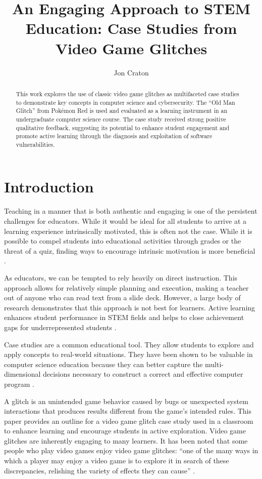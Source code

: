 \documentclass[letterpaper]{article}
\title{An Engaging Approach to STEM Education: Case Studies from Video Game Glitches}
\author[1]{Jon Craton}
\affil[1]{Anderson University, Anderson, IN}
\date{} %
\begin{document}
\maketitle

\begin{abstract}
This work explores the use of classic video game glitches as multifaceted case studies to demonstrate key concepts in computer science and cybersecurity. The ``Old Man Glitch'' from Pokémon Red is used and evaluated as a learning instrument in an undergraduate computer science course. The case study received strong positive qualitative feedback, suggesting its potential to enhance student engagement and promote active learning through the diagnosis and exploitation of software vulnerabilities.
\end{abstract}

\section{Introduction}
Teaching in a manner that is both authentic and engaging is one of the persistent challenges for educators. While it would be ideal for all students to arrive at a learning experience intrinsically motivated, this is often not the case. While it is possible to compel students into educational activities through grades or the threat of a quiz, finding ways to encourage intrinsic motivation is more beneficial \cite{deci2013intrinsic}.

As educators, we can be tempted to rely heavily on direct instruction. This approach allows for relatively simple planning and execution, making a teacher out of anyone who can read text from a slide deck. However, a large body of research demonstrates that this approach is not best for learners. Active learning enhances student performance in STEM fields \cite{freeman2014active} and helps to close achievement gaps for underrepresented students \cite{theobald2020active}.

Case studies are a common educational tool. They allow students to explore and apply concepts to real-world situations. They have been shown to be valuable in computer science education because they can better capture the multi-dimensional decisions necessary to construct a correct and effective computer program \cite{linn1992case}.

A glitch is an unintended game behavior caused by bugs or unexpected system interactions that produces results different from the game's intended rules. This paper provides an outline for a video game glitch case study used in a classroom to enhance learning and encourage students in active exploration. Video game glitches are inherently engaging to many learners. It has been noted that some people who play video games enjoy video game glitches: ``one of the many ways in which a player may enjoy a video game is to explore it in search of these discrepancies, relishing the variety of effects they can cause'' \cite{bainbridge2007creative}.
\end{document}
